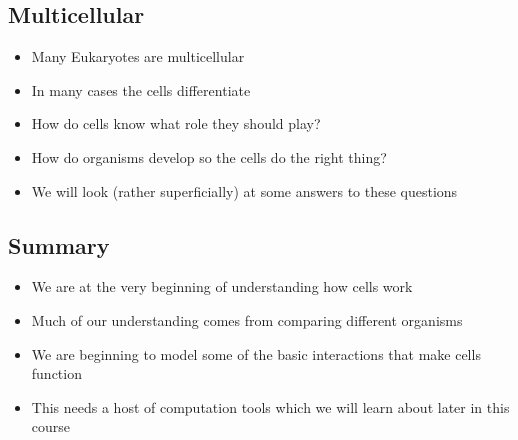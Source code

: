\begin{slide}
\section{Multicellular}

\begin{PauseHighLight}
  \begin{itemize}
  \item Many Eukaryotes are multicellular\pause
  \item In many cases the cells differentiate\pause
  \item How do cells know what role they should play?\pause
  \item How do organisms develop so the cells do the right thing?\pause
  \item We will look (rather superficially) at some answers to these
    questions\pause
  \end{itemize}
\end{PauseHighLight}


\end{slide}


\begin{slide}
\section{Summary}

\begin{PauseHighLight}
  \begin{itemize}
  \item We are at the very beginning of understanding how cells
    work\pause
  \item Much of our understanding comes from comparing different
    organisms\pause
  \item We are beginning to model some of the basic interactions that
    make cells function\pause
  \item This needs a host of computation tools\pause{} which we will
    learn about later in this course\pauseb
  \end{itemize}
\end{PauseHighLight}

\end{slide}
